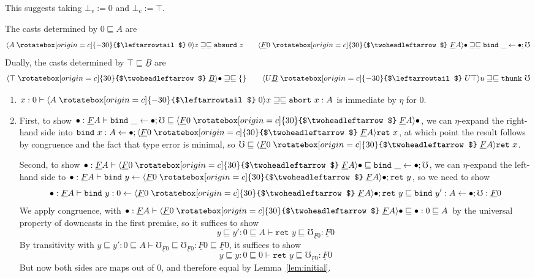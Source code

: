 \documentclass[acmsmall,nonacm]{acmart}
\renewcommand{\u}{\underline}
\newcommand{\ltdyn}{\sqsubseteq}
\newcommand{\gtdyn}{\sqsupseteq}
\newcommand{\equidyn}{\mathrel{\gtdyn\ltdyn}}
\newcommand{\uarrow}{\mathrel{\rotatebox[origin=c]{-30}{$\leftarrowtail$}}}
\newcommand{\darrow}{\mathrel{\rotatebox[origin=c]{30}{$\twoheadleftarrow$}}}
\newcommand{\upcast}[2]{\langle{#2}\uarrow{#1}\rangle}
\newcommand{\dncast}[2]{\langle{#1}\darrow{#2}\rangle}
\newcommand{\err}{\mho}
\newcommand{\bindXtoYinZ}[2]{\kw{bind}#2 \leftarrow #1;}
\newcommand{\kw}[1]{\texttt{#1}\,\,}
\newcommand{\absurd}{\kw{absurd}}
\newcommand{\ret}{\kw{ret}}
\newcommand{\thunk}{\kw{thunk}}
\newcommand{\abort}{\kw {abort}}
\begin{document}
\begin{longonly}
\begin{longonly}
This suggests taking $\bot_v := 0$ and $\bot_c := \top$.
\end{longonly}

\begin{theorem}
The casts determined by $0 \ltdyn A$ are
\[
\upcast{0}{A}z \equidyn \absurd z \qquad \dncast{\u F 0}{\u F A}{\bullet} \equidyn \bindXtoYinZ{\bullet}{\_}{\err}
\]
Dually, the casts determined by $\top \ltdyn \u B$ are
\[
\dncast{\top}{\u B}{\bullet} \equidyn \{\} \qquad \upcast{U \top}{U \u B}{u} \equidyn \thunk \err
\]
\end{theorem}

\begin{longproof}
  \begin{enumerate}
  \item $x : 0 \vdash \upcast{0}{A}{x} \equidyn \abort{x} : A$ is
    immediate by $\eta$ for $0$.

  \item First, to show
    $\bullet : \u F A \vdash \bindXtoYinZ{\bullet}{\_}{\err} \ltdyn \dncast{\u F 0}{\u F A}{\bullet}$,
    we can $\eta$-expand the right-hand side into
    $\bindXtoYinZ{\bullet}{x:A}{\dncast{\u F 0}{\u F A}{\ret{x}}}$,
    at which point the result follows by congruence
    and the fact that type error is minimal, so
    $\err \ltdyn {\dncast{\u F 0}{\u F A}{\ret{x}}}$.  

    Second, to show
    $\bullet : \u F A \vdash \dncast{\u F 0}{\u F A}{\bullet} \ltdyn \bindXtoYinZ{\bullet}{\_}{\err}$,
    we can $\eta$-expand the left-hand side to
    $\bullet : \u F A \vdash \bindXtoYinZ{\dncast{\u F 0}{\u F A}{\bullet}}{y}{\ret y}$,
    so we need to show
    \[
    \bullet: \u F A \vdash \bindXtoYinZ{\dncast{\u F 0}{\u F A}{\bullet}}{y:0}{\ret y} \ltdyn \bindXtoYinZ{\bullet}{y':A}{\err} : \u F 0
    \]
    We apply congruence, with $\bullet : \u F A \vdash {\dncast{\u F
        0}{\u F A}{\bullet}} \ltdyn \bullet : 0 \ltdyn A$ by the
    universal property of downcasts in the first premise, so it suffices
    to show
    \[
    y \ltdyn y' : 0 \ltdyn A \vdash \ret{y} \ltdyn \err_{\u F 0} : \u F 0
    \]
    By transitivity with $y \ltdyn y' : 0 \ltdyn A \vdash \err_{\u F 0}
    \ltdyn \err_{\u F 0} : \u F 0 \ltdyn \u F 0$, it suffices to show
    \[
    y \ltdyn y : 0 \ltdyn 0 \vdash \ret{y} \ltdyn \err_{\u F 0} : \u F 0
    \]
    But now both sides are maps out of $0$, and therefore equal by
    Lemma~\ref{lem:initial}.


\end{enumerate}
\end{longproof}
\end{longonly}
\end{document}
